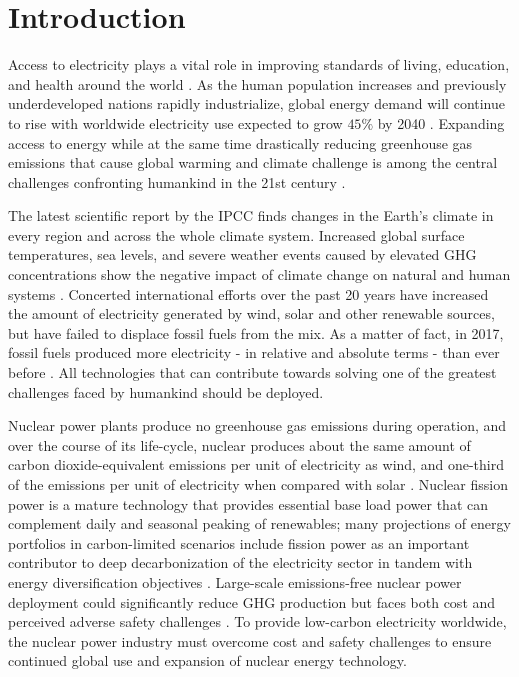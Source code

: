 \chapter{Introduction}
\glsresetall
\label{sec:intro}

Access to electricity plays a vital role in improving standards of living, 
education, and health around the world \cite{petti_future_2018}. 
As the human population increases and previously underdeveloped 
nations rapidly industrialize, global energy demand will continue to rise with 
worldwide electricity use expected to grow $45\%$ by 2040 
\cite{petti_future_2018,noauthor_us_nodate}.
Expanding access to energy while at the same time drastically reducing 
greenhouse gas emissions that cause global warming and climate challenge 
is among the central challenges confronting humankind in the 21st century
\cite{petti_future_2018}. 

The latest scientific report by the \gls{IPCC} finds changes in the Earth's climate 
in every region and across the whole climate system. 
Increased global surface temperatures, sea levels, and severe weather events 
caused by elevated \gls{GHG} concentrations show the negative impact of 
climate change on natural and human systems \cite{noauthor_climate_2018}. 
Concerted international efforts over the past 20 years have increased the amount 
of electricity generated by wind, solar and other renewable sources, but have 
failed to displace fossil fuels from the mix. 
As a matter of fact, in 2017, fossil fuels produced more electricity - in relative 
and absolute terms - than ever before \cite{noauthor_nuclear_nodate}.
All technologies that can contribute towards solving one of the greatest challenges 
faced by humankind should be deployed.

Nuclear power plants produce no greenhouse gas emissions during operation, and over 
the course of its life-cycle, nuclear produces about the same amount of carbon 
dioxide-equivalent emissions per unit of electricity as wind, and one-third of 
the emissions per unit of electricity when compared with solar 
\cite{noauthor_nuclear_nodate-1}.
Nuclear fission power is a mature technology that provides essential base load 
power that can complement daily and seasonal peaking of renewables; many 
projections of energy portfolios in carbon-limited scenarios include fission power as
an important contributor to deep decarbonization of the electricity sector in tandem 
with energy diversification objectives \cite{petti_future_2018,
noauthor_nuclear_nodate-1}.
Large-scale emissions-free nuclear power deployment could significantly 
reduce \gls{GHG} production but faces both cost and perceived adverse safety 
challenges \cite{noauthor_climate_2018, petti_future_2018}. 
To provide low-carbon electricity worldwide, the nuclear power industry must 
overcome cost and safety challenges to ensure continued global use and 
expansion of nuclear energy technology.

